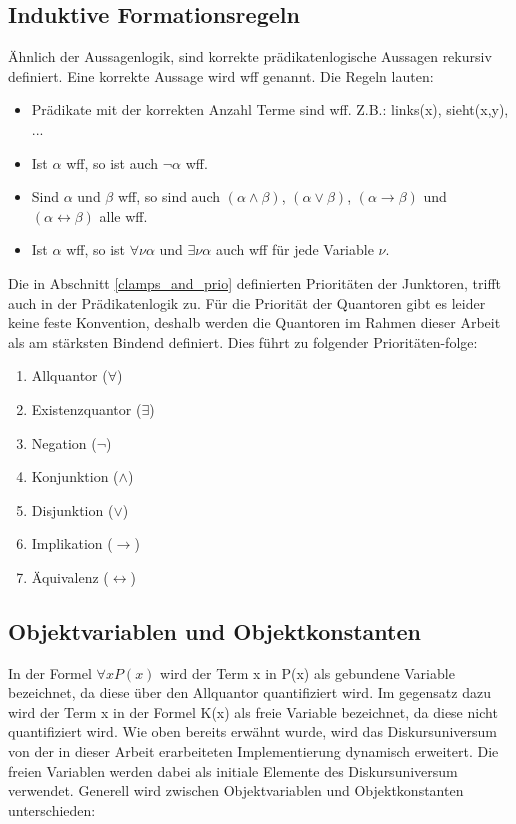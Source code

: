 \subsection{Induktive Formationsregeln}
Ähnlich der Aussagenlogik, sind korrekte prädikatenlogische Aussagen rekursiv definiert. Eine korrekte Aussage wird \ac{wff} genannt. Die Regeln lauten:
\begin{itemize}
\item
Prädikate mit der korrekten Anzahl Terme sind \ac{wff}. Z.B.: links(x), sieht(x,y), ...

\item
Ist $\alpha$ \ac{wff}, so ist auch $\neg\alpha$ \ac{wff}.

\item
Sind $\alpha$ und $\beta$ \ac{wff}, so sind auch $(\alpha\wedge\beta)$, $(\alpha\vee\beta)$, $(\alpha\rightarrow\beta)$ und $(\alpha\leftrightarrow\beta)$ alle \ac{wff}.

\item
Ist $\alpha$ \ac{wff}, so ist $\forall\nu\alpha$ und $\exists\nu\alpha$ auch \ac{wff} für jede Variable $\nu$.
\end{itemize}

Die in Abschnitt \ref{clamps_and_prio} definierten Prioritäten der Junktoren, trifft auch in der Prädikatenlogik zu. Für die Priorität der Quantoren gibt es leider keine feste Konvention, deshalb werden die Quantoren im Rahmen dieser Arbeit als am stärksten Bindend definiert. Dies führt zu folgender Prioritäten-folge:
\begin{enumerate}
\item Allquantor ($\forall$)
\item Existenzquantor ($\exists$)
\item Negation ($\neg$)
\item Konjunktion ($\wedge$)
\item Disjunktion ($\vee$)
\item Implikation ($\rightarrow$)
\item Äquivalenz ($\leftrightarrow$)
\end{enumerate}

\subsection{Objektvariablen und Objektkonstanten}
In der Formel $\forall x P(x)$ wird der Term x in P(x) als gebundene Variable bezeichnet, da diese über den Allquantor quantifiziert wird. Im gegensatz dazu wird der Term x in der Formel K(x) als freie Variable bezeichnet, da diese nicht quantifiziert wird. Wie oben bereits erwähnt wurde, wird das Diskursuniversum von der in dieser Arbeit erarbeiteten Implementierung dynamisch erweitert. Die freien Variablen werden dabei als initiale Elemente des Diskursuniversum verwendet. Generell wird zwischen Objektvariablen und Objektkonstanten unterschieden:

